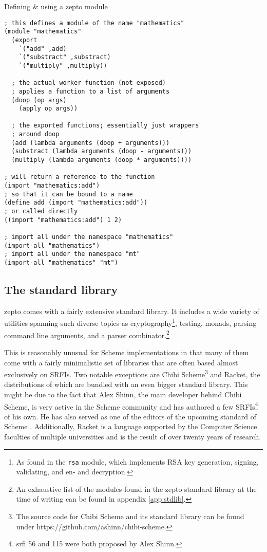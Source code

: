 \documentclass[oneside,11pt,xetex]{scrbook}
\begin{document}
\begin{listing}[H]
\caption{Defining \& using a zepto module}
\begin{verbatim}
; this defines a module of the name "mathematics"
(module "mathematics"
  (export
    `("add" ,add)
    `("substract" ,substract)
    `("multiply" ,multiply))

  ; the actual worker function (not exposed)
  ; applies a function to a list of arguments
  (doop (op args)
    (apply op args))

  ; the exported functions; essentially just wrappers
  ; around doop
  (add (lambda arguments (doop + arguments)))
  (substract (lambda arguments (doop - arguments)))
  (multiply (lambda arguments (doop * arguments))))

; will return a reference to the function
(import "mathematics:add")
; so that it can be bound to a name
(define add (import "mathematics:add"))
; or called directly
((import "mathematics:add") 1 2)

; import all under the namespace "mathematics"
(import-all "mathematics")
; import all under the namespace "mt"
(import-all "mathematics" "mt")
\end{verbatim}
\label{fig:zepmod}
\end{listing}

\subsection{The standard library}

zepto comes with a fairly extensive standard library. It includes a wide
variety of utilities spanning such diverse topics as cryptography\footnote{As found
in the \texttt{rsa} module, which implements RSA key generation, signing,
validating, and en- and decryption.}, testing, monads, parsing command line
arguments, and a parser combinator.\footnote{An exhaustive list of the modules
found in the zepto standard library at the time of writing can be found in appendix
\ref{app:stdlib}.}

This is reasonably unusual for Scheme implementations in that many of them
come with a fairly minimalistic set of libraries that are often based almost
exclusively on SRFIs. Two notable exceptions are Chibi Scheme\footnote{The source
code for Chibi Scheme and its standard library can be found under
https://github.com/ashinn/chibi-scheme.} and Racket, the distributions of which
are bundled with an even bigger standard library. This might be due to the fact
that Alex Shinn, the main developer behind Chibi Scheme, is very active in the
Scheme community and has authored a few SRFIs\footnote{\gls{srfi} 56 \parencite{SRFI56}
and 115 \parencite{SRFI115} were both proposed by Alex Shinn.} of his own. He has
also served as one of the editors of the upcoming standard of Scheme \parencite{R7RS}.
Additionally, Racket is a language supported by the Computer Science faculties of
multiple universities and is the result of over twenty years of research.
\end{document}
